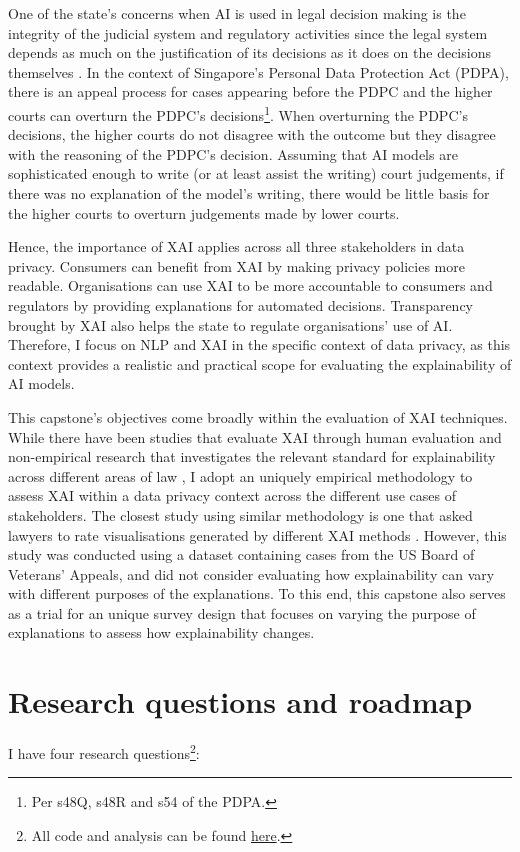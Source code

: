 One of the state's concerns when AI is used in legal decision making is the integrity of the judicial system and regulatory activities since the legal system depends as much on the justification of its decisions as it does on the decisions themselves \cite{chesterman2021_opacity}. In the context of Singapore's Personal Data Protection Act (PDPA), there is an appeal process for cases appearing before the PDPC and the higher courts can overturn the PDPC's decisions\footnote{Per s48Q, s48R and s54 of the PDPA.}. When overturning the PDPC's decisions, the higher courts do not disagree with the outcome but they disagree with the reasoning of the PDPC's decision. Assuming that AI models are sophisticated enough to write (or at least assist the writing) court judgements, if there was no explanation of the model's writing, there would be little basis for the higher courts to overturn judgements made by lower courts. 

Hence, the importance of XAI applies across all three stakeholders in data privacy. Consumers can benefit from XAI by making privacy policies more readable. Organisations can use XAI to be more accountable to consumers and regulators by providing explanations for automated decisions. Transparency brought by XAI also helps the state to regulate organisations' use of AI. Therefore, I focus on NLP and XAI in the specific context of data privacy, as this context provides a realistic and practical scope for evaluating the explainability of AI models.

This capstone's objectives come broadly within the evaluation of XAI techniques. While there have been studies that evaluate XAI through human evaluation \cite{vilone2021} and non-empirical research that investigates the relevant standard for explainability across different areas of law \cite{hacker2022varieties}, I adopt an uniquely empirical methodology to assess XAI within a data privacy context across the different use cases of stakeholders. The closest study using similar methodology is one that asked lawyers to rate visualisations generated by different XAI methods \cite{gorski2021}. However, this study was conducted using a dataset containing cases from the US Board of Veterans' Appeals, and did not consider evaluating how explainability can vary with different purposes of the explanations. To this end, this capstone also serves as a trial for an unique survey design that focuses on varying the purpose of explanations to assess how explainability changes.

\section{Research questions and roadmap}
\label{chap1:research_questions}
I have four research questions\footnote{All code and analysis can be found \href{https://github.com/TristanKoh/capstone-repo/}{here}.}: 

